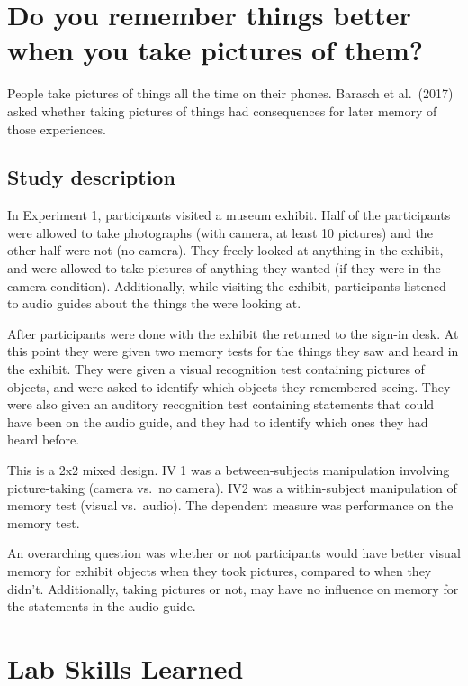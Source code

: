 \documentclass[
]{book}
\begin{document}
\hypertarget{do-you-remember-things-better-when-you-take-pictures-of-them}{%
\section{Do you remember things better when you take pictures of them?}\label{do-you-remember-things-better-when-you-take-pictures-of-them}}

People take pictures of things all the time on their phones. Barasch et
al.~(2017) asked whether taking pictures of things had consequences for
later memory of those experiences.

\hypertarget{study-description-5}{%
\subsection{Study description}\label{study-description-5}}

In Experiment 1, participants visited a museum exhibit. Half of the
participants were allowed to take photographs (with camera, at least 10
pictures) and the other half were not (no camera). They freely looked at
anything in the exhibit, and were allowed to take pictures of anything
they wanted (if they were in the camera condition). Additionally, while
visiting the exhibit, participants listened to audio guides about the
things the were looking at.

After participants were done with the exhibit the returned to the
sign-in desk. At this point they were given two memory tests for the
things they saw and heard in the exhibit. They were given a visual
recognition test containing pictures of objects, and were asked to
identify which objects they remembered seeing. They were also given an
auditory recognition test containing statements that could have been on
the audio guide, and they had to identify which ones they had heard
before.

This is a 2x2 mixed design. IV 1 was a between-subjects manipulation
involving picture-taking (camera vs.~no camera). IV2 was a
within-subject manipulation of memory test (visual vs.~audio). The
dependent measure was performance on the memory test.

An overarching question was whether or not participants would have
better visual memory for exhibit objects when they took pictures,
compared to when they didn't. Additionally, taking pictures or not, may
have no influence on memory for the statements in the audio guide.

\hypertarget{lab-skills-learned-5}{%
\section{Lab Skills Learned}\label{lab-skills-learned-5}}
\end{document}
